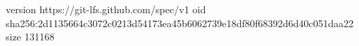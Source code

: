 version https://git-lfs.github.com/spec/v1
oid sha256:2d1135664c3072c0213d54173ea45b6062739e18df80f68392d6d40c051daa22
size 131168
